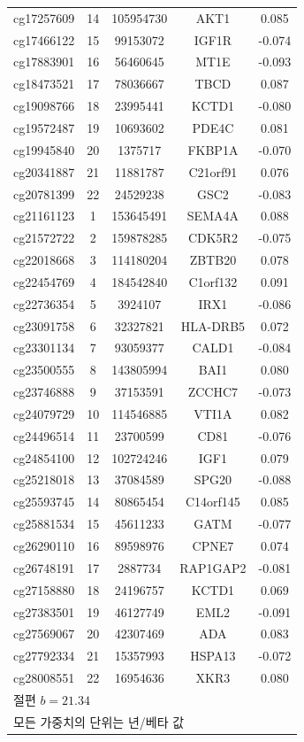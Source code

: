 \documentclass[12pt,a4paper]{article}
\begin{document}
\begin{longtable}{|c|c|c|c|c|}
		cg17257609 & 14 & 105954730 & AKT1 & 0.085 \\
		cg17466122 & 15 & 99153072 & IGF1R & -0.074 \\
		cg17883901 & 16 & 56460645 & MT1E & -0.093 \\
		cg18473521 & 17 & 78036667 & TBCD & 0.087 \\
		cg19098766 & 18 & 23995441 & KCTD1 & -0.080 \\
		cg19572487 & 19 & 10693602 & PDE4C & 0.081 \\
		cg19945840 & 20 & 1375717 & FKBP1A & -0.070 \\
		cg20341887 & 21 & 11881787 & C21orf91 & 0.076 \\
		cg20781399 & 22 & 24529238 & GSC2 & -0.083 \\
		cg21161123 & 1 & 153645491 & SEMA4A & 0.088 \\
		cg21572722 & 2 & 159878285 & CDK5R2 & -0.075 \\
		cg22018668 & 3 & 114180204 & ZBTB20 & 0.078 \\
		cg22454769 & 4 & 184542840 & C1orf132 & 0.091 \\
		cg22736354 & 5 & 3924107 & IRX1 & -0.086 \\
		cg23091758 & 6 & 32327821 & HLA-DRB5 & 0.072 \\
		cg23301134 & 7 & 93059377 & CALD1 & -0.084 \\
		cg23500555 & 8 & 143805994 & BAI1 & 0.080 \\
		cg23746888 & 9 & 37153591 & ZCCHC7 & -0.073 \\
		cg24079729 & 10 & 114546885 & VTI1A & 0.082 \\
		cg24496514 & 11 & 23700599 & CD81 & -0.076 \\
		cg24854100 & 12 & 102724246 & IGF1 & 0.079 \\
		cg25218018 & 13 & 37084589 & SPG20 & -0.088 \\
		cg25593745 & 14 & 80865454 & C14orf145 & 0.085 \\
		cg25881534 & 15 & 45611233 & GATM & -0.077 \\
		cg26290110 & 16 & 89598976 & CPNE7 & 0.074 \\
		cg26748191 & 17 & 2887734 & RAP1GAP2 & -0.081 \\
		cg27158880 & 18 & 24196757 & KCTD1 & 0.069 \\
		cg27383501 & 19 & 46127749 & EML2 & -0.091 \\
		cg27569067 & 20 & 42307469 & ADA & 0.083 \\
		cg27792334 & 21 & 15357993 & HSPA13 & -0.072 \\
		cg28008551 & 22 & 16954636 & XKR3 & 0.080 \\
		\hline
		\multicolumn{5}{l}{\footnotesize 절편 \(b = 21.34\)} \\
		\multicolumn{5}{l}{\footnotesize 모든 가중치의 단위는 년/베타 값} \\
	\end{longtable}
	
\end{document}
